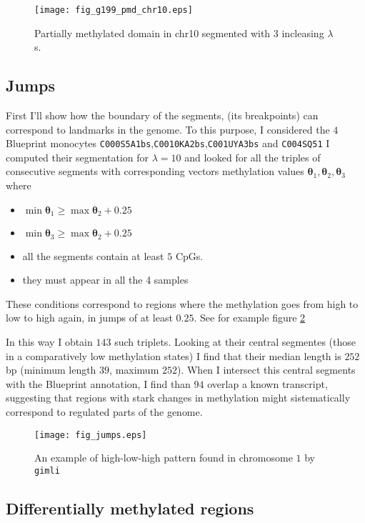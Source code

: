 \documentclass[12pt]{amsart}
\newcommand{\gimli}{\texttt{gimli}}
\begin{document}
\begin{figure}\label{fig_g199_pmd_chr10.eps}
\texttt{[image: fig\_g199\_pmd\_chr10.eps]}
\caption{Partially methylated domain in chr10 segmented with $3$ incleasing $\lambda$s.}
\end{figure}


\subsection{Jumps}

First I'll show how the boundary of the segments, (its  breakpoints)
can correspond to landmarks in the genome. To this purpose, I considered the 
$4$ Blueprint monocytes \verb=C000S5A1bs=,\verb=C0010KA2bs=,\verb=C001UYA3bs= and \verb=C004SQ51= 
I computed their segmentation for $\lambda=10$ and looked for all the triples of consecutive segments
with corresponding vectors methylation values $\pmb{\theta}_{1},\pmb{\theta}_{2},\pmb{\theta}_{3}$
where 
\begin{itemize}
\item{} $\min \pmb{\theta}_1 \geq \max \pmb{\theta}_2 + 0.25$
\item{} $\min \pmb{\theta}_{3} \geq \max \pmb{\theta}_2 + 0.25$
\item{} all the segments contain at least $5$ CpGs.
\item{} they must appear in all the 4 samples
\end{itemize}

These conditions correspond to regions where the methylation goes from 
high to low to high again,
in jumps of at least $0.25$.
See for example figure \ref{fig_jumps} 

In this way I obtain $143$ such triplets. Looking at their central segmentes
(those in a comparatively low methylation states) I find that their median length is
$252$bp (minimum length $39$, maximum $252$). When I intersect this central segments with the Blueprint
annotation, I find than $94$ overlap a known transcript, suggesting that regions with stark 
changes in methylation
might sistematically correspond to regulated parts of the genome.

\begin{figure}\label{fig_jumps}
\texttt{[image: fig\_jumps.eps]}
\caption{An example of high-low-high pattern found in chromosome $1$ by \gimli{}}
\end{figure}

\subsection{Differentially methylated regions}
\end{document}
